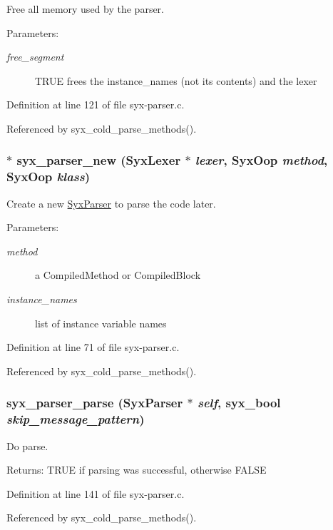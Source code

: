 Free all memory used by the parser.

\begin{Desc}
\item[Parameters:]
\begin{description}
\item[{\em free\_\-segment}]TRUE frees the instance\_\-names (not its contents) and the lexer \end{description}
\end{Desc}


Definition at line 121 of file syx-parser.c.

Referenced by syx\_\-cold\_\-parse\_\-methods().\hypertarget{syx-parser_8c_2bc8f2f4ebbc4d1a1d41725b5a0b3e52}{
\subsubsection{$\ast$ syx\_\-parser\_\-new ({\bf SyxLexer} $\ast$ {\em lexer}, \/  {\bf SyxOop} {\em method}, \/  {\bf SyxOop} {\em klass})}}
\label{syx-parser_8c_2bc8f2f4ebbc4d1a1d41725b5a0b3e52}


Create a new \hyperlink{struct_syx_parser}{SyxParser} to parse the code later.

\begin{Desc}
\item[Parameters:]
\begin{description}
\item[{\em method}]a CompiledMethod or CompiledBlock \item[{\em instance\_\-names}]list of instance variable names \end{description}
\end{Desc}


Definition at line 71 of file syx-parser.c.

Referenced by syx\_\-cold\_\-parse\_\-methods().\hypertarget{syx-parser_8c_24ec03586673549113d3cce34214e53f}{
\subsubsection{ syx\_\-parser\_\-parse ({\bf SyxParser} $\ast$ {\em self}, \/  {\bf syx\_\-bool} {\em skip\_\-message\_\-pattern})}}
\label{syx-parser_8c_24ec03586673549113d3cce34214e53f}


Do parse.

\begin{Desc}
\item[Returns:]TRUE if parsing was successful, otherwise FALSE \end{Desc}


Definition at line 141 of file syx-parser.c.

Referenced by syx\_\-cold\_\-parse\_\-methods().